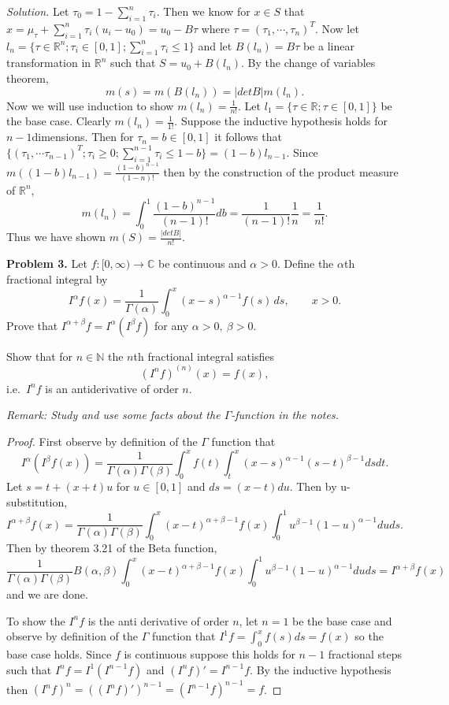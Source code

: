 \documentclass[11pt]{article}
\newcommand{\N}{\mathbb{N}}
\newcommand{\C}{\mathbb{C}}
\begin{document}
\bigskip
\noindent\textit{Solution.}
Let $\tau_0 = 1 - \sum_{i=1}^n \tau_i$. Then we know for $x \in S$ that $x = \mu_\tau + \sum_{i=1}^{n} \tau_i(u_i - u_0) = u_0 - B\tau$ where $\tau = (\tau_1, \cdots, \tau_{n})^T.$ 
Now let $l_n = \{\tau \in \mathbb{R}^n; \tau_i \in [0,1]; \sum_{i=1}^n \tau_i \leq 1\}$ and let $B(l_n) = B\tau$ be a linear transformation in $\mathbb{R}^n$ such that $S = u_0 + B(l_n)$. By the change of variables theorem, 
$$m(s) = m(B(l_n)) = |detB|m(l_n).$$
Now we will use induction to show $m(l_n) = \frac{1}{n!}$. Let $l_1 = \{\tau \in \mathbb{R}; \tau \in [0,1]\}$ be the base case. Clearly $m(l_n) = \frac{1}{1!}$. Suppose the inductive hypothesis holds for $n-1$dimensions. Then for $\tau_n = b \in [0,1]$ it follows that $\{(\tau_1, \cdots \tau_{n-1})^T; \tau_i \geq 0; \sum_{i=1}^{n-1} \tau_i \leq 1 - b\} = (1-b)l_{n-1}$. Since $m((1-b)l_{n-1}) = \frac{(1-b)^{n-1}}{(1-n)!}$ then by the construction of the product measure of $\mathbb{R}^n$,
$$m(l_n) = \int_0^1 \frac{(1-b)^{n-1}}{(n-1)!} db = \frac{1}{(n-1)!} \frac{1}{n} = \frac{1}{n!}.$$
Thus we have shown $m(S) = \frac{|detB|}{n!}.$


\noindent\textbf{Problem 3.}
Let $f : [0, \infty) \to \C$ be continuous and $\alpha > 0$. Define the $\alpha$th fractional integral by
\[
    I^\alpha f(x) = \frac{1}{\Gamma(\alpha)} \int_0^x (x-s)^{\alpha - 1} f(s)\,ds, \qquad x > 0.
\]
Prove that $I^{\alpha + \beta} f = I^\alpha(I^\beta f)$ for any $\alpha > 0,\ \beta > 0$.

\medskip
Show that for $n \in \N$ the $n$th fractional integral satisfies
\[
    (I^n f)^{(n)}(x) = f(x),
\]
i.e.\ $I^n f$ is an antiderivative of order $n$.

\medskip
\noindent\textit{Remark: Study and use some facts about the $\Gamma$-function in the notes.}

\bigskip
\begin{proof}
	First observe by definition of the $\Gamma$ function that 
	$$I^{\alpha}(I^{\beta} f(x)) = \frac{1}{\Gamma(\alpha)\Gamma(\beta)} \int_0^x f(t)\int_t^x (x-s)^{\alpha-1} (s-t)^{\beta-1} ds dt.$$
	Let $s = t + (x+t)u$ for $u\in [0,1]$ and $ds=(x-t)du$. Then by u-substitution, 
	$$I^{\alpha+\beta} f(x) = \frac{1}{\Gamma(\alpha)\Gamma(\beta)} \int_0^x (x-t)^{\alpha +\beta - 1} f(x) \int_0^1 u^{\beta-1} (1-u)^{\alpha-1} du ds.$$ 
	Then by theorem 3.21 of the Beta function, 
	$$\frac{1}{\Gamma(\alpha)\Gamma(\beta)} B(\alpha, \beta) \int_0^x (x-t)^{\alpha +\beta - 1} f(x) \int_0^1 u^{\beta-1} (1-u)^{\alpha-1} du ds = I^{\alpha + \beta} f(x)$$ 
	and we are done.

	\medskip
	\noindent To  show the $I^nf$ is the anti derivative of order $n$, let $n=1$ be the base case and observe by definition of the $\Gamma$ function that $I^1 f = \int_0^x f(s) ds = f(x)$ so the base case holds. Since $f$ is continuous suppose this holds for $n-1$ fractional steps such that $I^n f = I^1 (I^{n-1} f)$ and $(I^n f)'  = I^{n-1} f$. By the inductive hypothesis then $(I^n f)^n = ((I^{n} f)')^{n-1} = (I^{n-1} f)^{n-1} = f$. 
\end{proof}
\end{document}
